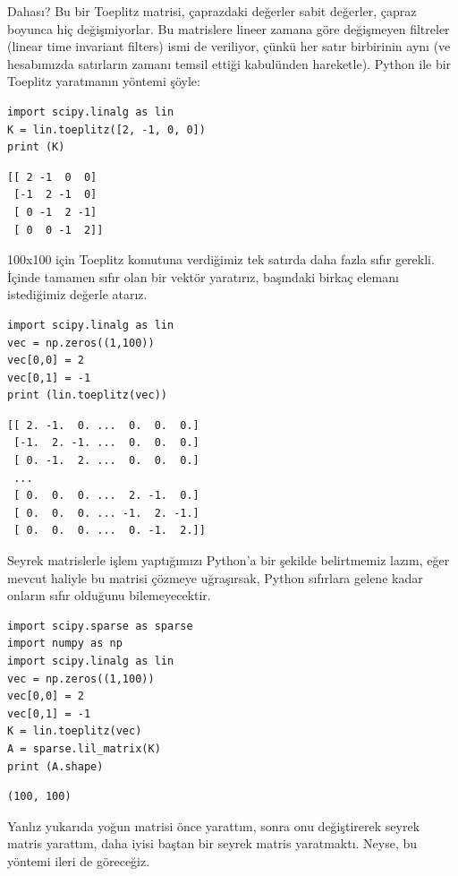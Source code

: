 \documentclass[12pt,fleqn]{article}\usepackage{../../common}
\begin{document}
Dahası? Bu bir Toeplitz matrisi, çaprazdaki değerler sabit değerler, çapraz
boyunca hiç değişmiyorlar. Bu matrislere lineer zamana göre değişmeyen
filtreler (linear time invariant filters) ismi de veriliyor, çünkü her
satır birbirinin aynı (ve hesabımızda satırların zamanı temsil ettiği
kabulünden hareketle). Python ile bir Toeplitz yaratmanın yöntemi şöyle:

\begin{verbatim}
import scipy.linalg as lin
K = lin.toeplitz([2, -1, 0, 0])
print (K)
\end{verbatim}

\begin{verbatim}
[[ 2 -1  0  0]
 [-1  2 -1  0]
 [ 0 -1  2 -1]
 [ 0  0 -1  2]]
\end{verbatim}

100x100 için Toeplitz komutuna verdiğimiz tek satırda daha fazla sıfır
gerekli. İçinde tamamen sıfır olan bir vektör yaratırız, başındaki birkaç
elemanı istediğimiz değerle atarız. 

\begin{verbatim}
import scipy.linalg as lin
vec = np.zeros((1,100))
vec[0,0] = 2
vec[0,1] = -1
print (lin.toeplitz(vec))
\end{verbatim}

\begin{verbatim}
[[ 2. -1.  0. ...  0.  0.  0.]
 [-1.  2. -1. ...  0.  0.  0.]
 [ 0. -1.  2. ...  0.  0.  0.]
 ...
 [ 0.  0.  0. ...  2. -1.  0.]
 [ 0.  0.  0. ... -1.  2. -1.]
 [ 0.  0.  0. ...  0. -1.  2.]]
\end{verbatim}

Seyrek matrislerle işlem yaptığımızı Python'a bir şekilde belirtmemiz
lazım, eğer mevcut haliyle bu matrisi çözmeye uğraşırsak, Python sıfırlara
gelene kadar onların sıfır olduğunu bilemeyecektir. 

\begin{verbatim}
import scipy.sparse as sparse
import numpy as np
import scipy.linalg as lin
vec = np.zeros((1,100))
vec[0,0] = 2
vec[0,1] = -1
K = lin.toeplitz(vec)
A = sparse.lil_matrix(K)
print (A.shape)
\end{verbatim}

\begin{verbatim}
(100, 100)
\end{verbatim}

Yanlız yukarıda yoğun matrisi önce yarattım, sonra onu değiştirerek seyrek
matris yarattım, daha iyisi baştan bir seyrek matris yaratmaktı. Neyse, bu
yöntemi ileri de göreceğiz. 
\end{document}
